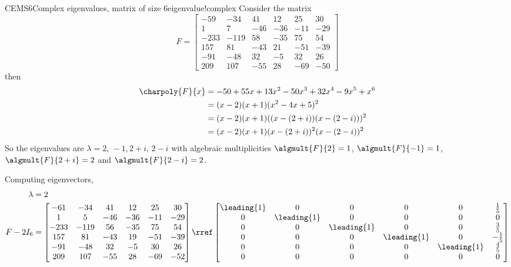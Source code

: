 \begin{example}{CEMS6}{Complex eigenvalues, matrix of size 6}{eigenvalue!complex}
Consider the matrix
%
\begin{equation*}
F=
\begin{bmatrix}
-59 & -34 & 41 & 12 & 25 & 30\\ 
1 & 7 & -46 & -36 & -11 & -29\\ 
-233 & -119 & 58 & -35 & 75 & 54\\ 
157 & 81 & -43 & 21 & -51 & -39\\ 
-91 & -48 & 32 & -5 & 32 & 26\\ 
209 & 107 & -55 & 28 & -69 & -50
\end{bmatrix}
\end{equation*}
%
then
%
\begin{align*}
\charpoly{F}{x}&=-50+55x+13x^2-50x^3+32x^4-9x^5+x^6\\
 &=(x-2)(x+1)(x^2-4x+5)^2\\
 &=(x-2)(x+1)((x-(2+i))(x-(2-i)))^2\\
 &=(x-2)(x+1)(x-(2+i))^2(x-(2-i))^2\\
\end{align*}
%
So the eigenvalues are $\lambda=2,\,-1,2+i,\,2-i$ with algebraic multiplicities $\algmult{F}{2}=1$, $\algmult{F}{-1}=1$, $\algmult{F}{2+i}=2$ and $\algmult{F}{2-i}=2$.\par
%
Computing eigenvectors,
%
\begin{align*}
\lambda&=2\\
F-2I_6&=
\begin{bmatrix}
-61 & -34 & 41 & 12 & 25 & 30\\
1 & 5 & -46 & -36 & -11 & -29\\
-233 & -119 & 56 & -35 & 75 & 54\\
157 & 81 & -43 & 19 & -51 & -39\\
-91 & -48 & 32 & -5 & 30 & 26\\
209 & 107 & -55 & 28 & -69 & -52
\end{bmatrix}
\rref
\begin{bmatrix}
\leading{1} & 0 & 0 & 0 & 0 & \frac{1}{5}\\ 
0 & \leading{1} & 0 & 0 & 0 & 0\\ 
0 & 0 & \leading{1} & 0 & 0 & \frac{3}{5}\\ 
0 & 0 & 0 & \leading{1} & 0 & -\frac{1}{5}\\ 
0 & 0 & 0 & 0 & \leading{1} & \frac{4}{5}\\ 
0 & 0 & 0 & 0 & 0 & 0
\end{bmatrix}\\

\end{align*}
\end{example}
